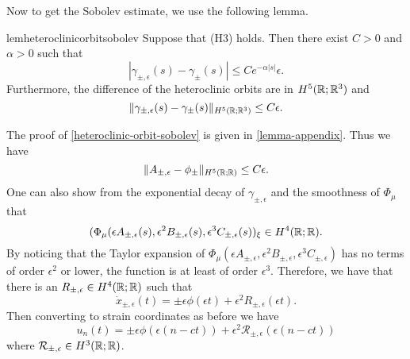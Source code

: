 Now to get the Sobolev estimate, we use the following lemma.
\begin{restatable}{lem}{heteroclinicorbitsobolev}\label{heteroclinic-orbit-sobolev}
	Suppose that (H3) holds. Then there exist \(C> 0\) and \(\alpha > 0\) such that
	\begin{equation}
		| \gamma_{\pm, \epsilon}(s) - \gamma_{\pm}(s) | \leq C e^{-\alpha| s|} \epsilon.
	\end{equation}
	Furthermore, the difference of the heteroclinic orbits are in \(H^5(\mathbb{R}; \mathbb{R}^3)\) and 
	\begin{equation}
		\| \gamma_{\pm, \epsilon}(s) - \gamma_{\pm}(s) \|_{H^5(\mathbb{R};\mathbb{R}^3)}  \leq C \epsilon.
	\end{equation}
\end{restatable}
The proof of \cref{heteroclinic-orbit-sobolev} is given in \cref{lemma-appendix}. Thus we have
\begin{equation}
	\|A_{\pm, \epsilon} - \phi_{\pm}\|_{H^5(\mathbb{R};\mathbb{R})} \leq C \epsilon.
\end{equation}
One can also show from the exponential decay of \(\gamma_{\pm, \epsilon}\) and the smoothness of \(\Phi_\mu\) that
\begin{equation}
	(\Phi_\mu(\epsilon A_{\pm, \epsilon}(s),\epsilon^2 B_{\pm, \epsilon}(s) ,\epsilon^3 C_{\pm, \epsilon}(s))_\xi \in H^4(\mathbb{R};\mathbb{R}).
\end{equation}
By noticing that the Taylor expansion of \(\Phi_\mu(\epsilon A_{\pm, \epsilon}, \epsilon^2 B_{\pm, \epsilon}, \epsilon^3 C_{\pm, \epsilon})\) has no terms of order \(\epsilon^2\) or lower, the function is at least of order \(\epsilon^3\). Therefore, we have that there is an \(R_{\pm,\epsilon} \in H^4(\mathbb{R};\mathbb{R})\) such that
\begin{equation}
	\dot x_{\pm, \epsilon }(t) = \pm \epsilon\phi(\epsilon t) + \epsilon^2 R_{\pm,\epsilon}(\epsilon t).
\end{equation}
Then converting to strain coordinates as before we have
\begin{equation}
	u_n(t) = \pm\epsilon\phi(\epsilon(n-ct)) + \epsilon^2 \mathcal R_{\pm, \epsilon}(\epsilon(n-ct))
\end{equation}
where \(\mathcal R_{\pm, \epsilon} \in H^3(\mathbb{R};\mathbb{R})\).

